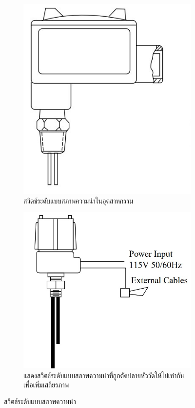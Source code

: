 \documentclass[final,11pt]{article}
\begin{document}
\begin{figure}
    \begin{subfigure}[b]{0.3\textwidth}
        \centering
        \includegraphics[width=\textwidth]{images/Screenshot_8.jpg}
        \caption{สวิตช์ระดับแบบสภาพความนำในอุตสาหกรรม}
        \label{fig:cls1}
    \end{subfigure}
    \hfill
    \begin{subfigure}[b]{0.3\textwidth}
        \centering
        \includegraphics[width=\textwidth]{images/Screenshot_9.jpg}
        \caption{แสดงสวิตช์ระดับแบบสภาพความนำที่ถูกตัดปลายหัววัดให้ไม่เท่ากันเพื่อเพิ่มเสถียรภาพ}
        \label{fig:cls2}
    \end{subfigure}
    \hfill
    \caption{สวิตช์ระดับแบบสภาพความนำ}
    \label{fig:cls}
\end{figure}
\end{document}
